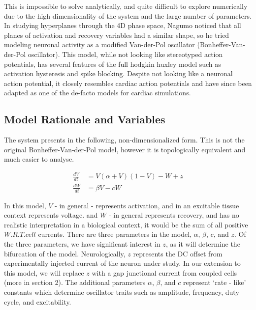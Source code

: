 \documentclass[11pt]{article}
\begin{document}
This is impossible to solve analytically, and quite difficult to explore numerically due to the high dimensionality of the system and the large number of parameters. In studying hyperplanes through the 4D phase space, Nagumo noticed that all planes of activation and recovery variables had a similar shape, so he tried modeling neuronal activity as a modified Van-der-Pol oscillator (Bonheffer-Van-der-Pol oscillator). This model, while not looking like stereotyped action potentials, has several features of the full hodgkin huxley model such as activation hysteresis and spike blocking. Despite not looking like a neuronal action potential, it closely resembles cardiac action potentials and have since been adapted as one of the de-facto models for cardiac simulations. 


\subsection{Model Rationale and Variables}

The system presents in the following, non-dimensionalized form. This is not the original Bonheffer-Van-der-Pol model, however it is topologically equivalent and much easier to analyse.

\begin{align} \frac{dV}{dt} &= V(\alpha+V)(1-V) -W + z \\
\frac{dW}{dt} &= \beta V-cW \end{align}

In this model, $V$ - in general - represents activation, and in an excitable tissue context represents voltage. and $W$ - in general represents recovery, and has no realistic interpretation in a biological context, it would be the sum of all positive \( W.R.T. cell \) currents. There are three parameters in the model, $\alpha$, $\beta$, $c$, and $z$. Of the three parameters, we have significant interest in $z$, as it will determine the bifurcation of the model. Neurologically, $z$ represents the DC offset from experimentally injected current of the neuron under study. In our extension to this model, we will replace $z$ with a gap junctional current from coupled cells (more in section 2). The additional parameters $\alpha$, $\beta$, and $c$ represent `rate - like' constants which determine oscillator traits such as amplitude, frequency, duty cycle, and excitability.
\end{document}
